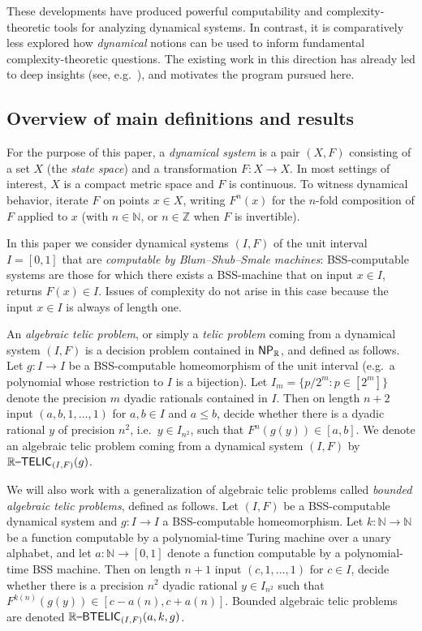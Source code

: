 \documentclass{amsart}
\theoremstyle{theorem}
\theoremstyle{remark}
\newcommand{\NN}{\mathbb{N}}
\newcommand{\RR}{\mathbb{R}}
\newcommand{\ZZ}{\mathbb{Z}}
\newcommand{\ccNP}{\textsf{\upshape NP}}
\newcommand{\ccRTELIC}{\mathbb{R}\textsf{\upshape --TELIC}}
\newcommand{\ccRBTELIC}{\mathbb{R}\textsf{\upshape --BTELIC}}
\begin{document}
These developments have produced powerful computability and complexity-theoretic tools for analyzing dynamical systems. In contrast, it is comparatively less explored how \emph{dynamical} notions can be used to inform fundamental complexity-theoretic questions. The existing work in this direction has already led to deep insights (see, e.g.\ \cite{blanc_et_alICALP,bournez2017polynomial,cotler2024computational}), and motivates the program pursued here.

\subsection{Overview of main definitions and results}

For the purpose of this paper, a \emph{dynamical system} is a pair $(X,F)$ consisting of a set $X$ (the \emph{state space}) and a transformation $F:X\to X$. In most settings of interest, $X$ is a compact metric space and $F$ is continuous. To witness dynamical behavior, iterate $F$ on points $x\in X$, writing $F^n(x)$ for the $n$-fold composition of $F$ applied to $x$ (with $n\in\NN$, or $n\in\ZZ$ when $F$ is invertible).

In this paper we consider dynamical systems $(I, F)$ of the unit interval $I=[0,1]$ that are \emph{computable by Blum--Shub--Smale machines}: BSS-computable systems are those for which there exists a BSS-machine that on input $x \in I$, returns $F(x) \in I$. Issues of complexity do not arise in this case because the input $x \in I$ is always of length one.

An \emph{algebraic telic problem}, or simply a \emph{telic problem} coming from a dynamical system $(I, F)$ is a decision problem contained in $\ccNP_\RR$, and defined as follows.
Let $g:I\rightarrow I$ be a BSS-computable homeomorphism of the unit interval (e.g.\ a polynomial whose restriction to $I$ is a bijection).
Let $I_m=\{p/2^m:p\in [2^m]\}$ denote the precision $m$ dyadic rationals contained in $I$.
Then on length $n+2$ input $(a, b, 1,\dots,1)$ for $a, b \in I$ and $a\leq b$, decide whether there is a dyadic rational $y$ of precision $n^2$, i.e.\ $y \in I_{n^2}$, such that $F^n(g(y)) \in [a, b]$.
We denote an algebraic telic problem coming from a dynamical system $(I, F)$ by $\ccRTELIC_{(I, F)}(g)$.

We will also work with a generalization of algebraic telic problems called \emph{bounded algebraic telic problems}, defined as follows.
Let $(I, F)$ be a BSS-computable dynamical system and $g:I\rightarrow I$ a BSS-computable homeomorphism. Let $k:\NN\rightarrow \NN$ be a function computable by a polynomial-time Turing machine over a unary alphabet, and let $a:\NN\rightarrow [0,1]$ denote a function computable by a polynomial-time BSS machine.
Then on length $n+1$ input $(c, 1,\dots,1)$ for $c\in I$, decide whether there is a precision $n^2$ dyadic rational $y \in I_{n^2}$ such that $F^{k(n)}(g(y)) \in [c-a(n), c+a(n)]$. Bounded algebraic telic problems are denoted $\ccRBTELIC_{(I, F)}(a, k, g)$.
\end{document}
